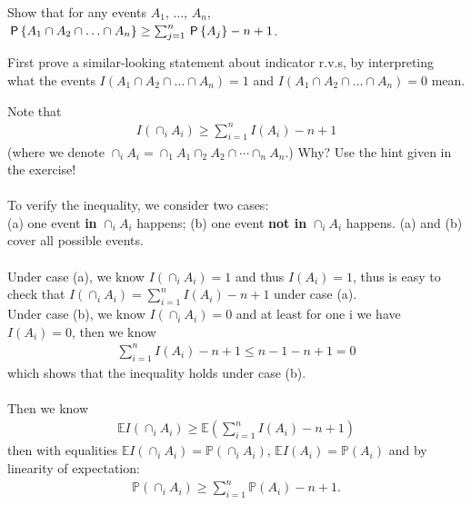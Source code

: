
\setcounter{theorem}{44}
\begin{exercise} [BH.4.45] Show that for any events $A_1$, $\ldots$, $A_n$, $\P{A_1 \cap A_2 \cap \hdots \cap A_n} \geq \sum_{j = 1}^n \P{A_j} - n + 1$.
\begin{hint}
    First prove a similar-looking statement about indicator r.v.s, by interpreting what the events $I(A_1 \cap A_2 \cap \hdots \cap A_n) = 1$ and $I(A_1 \cap A_2 \cap \hdots \cap A_n) = 0$ mean.
\end{hint}
\begin{solution}
    Note that
    \begin{align*}
    	I\left(\cap_i A_i \right) \geq \sum_{i=1}^n I(A_i) -n +1
    \end{align*}
    (where we denote $\cap_i A_i=\cap_1 A_1 \cap_2 A_2 \cap \cdots \cap_n A_n$.) Why?  Use the hint given in the exercise!\\~\\
    To verify the inequality, we consider two cases:\\ 
    (a) one event \textbf{in} $\cap_i A_i$ happens; (b) one event \textbf{not in} $\cap_i A_i$ happens. (a) and (b) cover all possible events. 
    ~\\~\\
    Under case (a), we know $I\left(\cap_i A_i \right)=1$ and thus $I(A_i)=1$, thus is easy to check that $	I\left(\cap_i A_i \right) = \sum_{i=1}^n I(A_i) -n +1$ under case (a).
    ~\\
    Under case (b), we know $I\left(\cap_i A_i \right)=0$ and at least for one i we have $I(A_i)=0$, then we know 
    \begin{align*}
    	\sum_{i=1}^n I(A_i) -n +1 \leq n-1 -n+1 =0
    \end{align*}
    which shows that the inequality holds under case (b).\\~\\
    Then we know 
    \begin{align*}
    	\mathbb{E}I\left(\cap_i A_i \right) \geq \mathbb{E}\left(\sum_{i=1}^n I(A_i) -n +1\right)
    \end{align*} 
    then with equalities $\mathbb{E}I\left(\cap_i A_i \right) = \mathbb{P}\left(\cap_i A_i \right)$, $\mathbb{E}I\left( A_i \right) = \mathbb{P}\left( A_i \right)$ and by linearity of expectation:
    \begin{align*}
    	\mathbb{P}\left(\cap_i A_i \right) \geq  \sum_{i=1}^n \mathbb{P}\left( A_i \right) -n +1 .
    \end{align*}
\end{solution}
\end{exercise}

